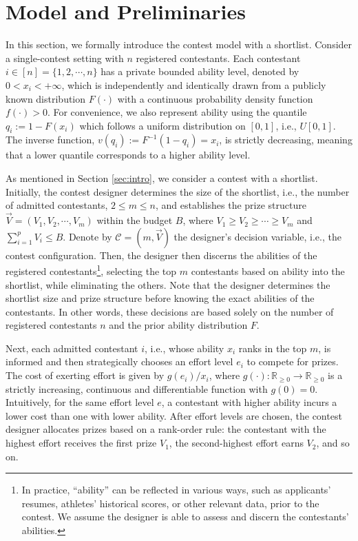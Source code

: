 \section{Model and Preliminaries}
\label{sec:pre}

In this section, we formally introduce the contest model with a shortlist. %
Consider a single-contest setting with $n$ registered contestants. Each contestant $i \in [n]=\{1,2,\cdots, n\}$ has a private bounded ability level, denoted by $0<x_i<+\infty$, which is independently and identically drawn from a publicly known distribution  $F(\cdot)$ with a continuous probability density function $f(\cdot)>0$. For convenience, we also represent ability using the quantile $q_i := 1-F(x_i)$ which follows a uniform distribution on $[0, 1]$, i.e., $U[0,1]$. The inverse function, $v(q_i):=F^{-1}(1-q_i)=x_i$,  is strictly decreasing, meaning that a lower quantile corresponds to a higher ability level.

As mentioned in Section \ref{sec:intro}, we consider a contest with a shortlist. Initially, the contest designer determines the size of the shortlist, i.e., the number of admitted contestants, $2\leq m \leq n$, and establishes the prize structure $\vec{V}=(V_1, V_2, \cdots, V_m)$ within the budget $B$, where  $V_1 \geq V_2\geq  \cdots \geq V_m$ and $\sum_{i=1}^p V_i \leq B$. Denote by $\mathcal{C}=(m,\vec{V})$ the designer's decision variable, i.e., the contest configuration. Then, the designer then discerns the abilities of the registered contestants\footnote{In practice, ``ability'' can be reflected in various ways, such as applicants' resumes, athletes' historical scores, or other relevant data, prior to the contest. We assume the designer is able to assess and discern the contestants' abilities.},
selecting the top $m$ contestants based on ability into the shortlist, while eliminating the others. Note that the designer determines the shortlist size and prize structure before knowing the exact abilities of the contestants. In other words, these decisions are based solely on the number of registered contestants $n$ and the prior ability distribution $F$. 

Next, each admitted contestant $i$, i.e., whose ability $x_i$ ranks in the top $m$, is informed and then strategically chooses an effort level $e_i$ to compete for prizes. The cost of exerting effort is given by $g(e_i)/x_i$, where $g(\cdot): \mathbb{R}_{\geq 0} \rightarrow \mathbb{R}_{\geq 0}$ is a strictly increasing, continuous and differentiable function with $g(0)=0$. Intuitively, for the same effort level $e$, a contestant with higher ability incurs a lower cost than one with lower ability. After effort levels are chosen, the contest designer allocates prizes based on a rank-order rule: the contestant with the highest effort receives the first prize $V_1$, the second-highest effort earns $V_2$, and so on. 

